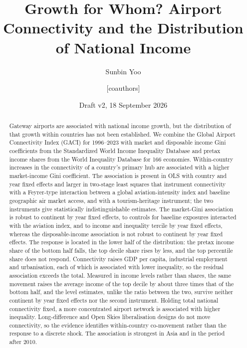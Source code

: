 \documentclass[12pt]{article}
\title{Growth for Whom? Airport Connectivity and the Distribution of National Income}
\author{Sunbin Yoo \and [coauthors]}
\date{Draft v2, 18 September 2026}
\begin{document}
\maketitle

\begin{abstract}
Gateway airports are associated with national income growth, but the distribution of that growth within countries has not been established. We combine the Global Airport Connectivity Index (GACI) for 1996--2023 with market and disposable income Gini coefficients from the Standardized World Income Inequality Database and pretax income shares from the World Inequality Database for 166 economies. Within-country increases in the connectivity of a country's primary hub are associated with a higher market-income Gini coefficient. The association is present in OLS with country and year fixed effects and larger in two-stage least squares that instrument connectivity with a Feyrer-type interaction between a global aviation-intensity index and baseline geographic air market access, and with a tourism-heritage instrument; the two instruments give statistically indistinguishable estimates. The market-Gini association is robust to continent by year fixed effects, to controls for baseline exposures interacted with the aviation index, and to income and inequality tercile by year fixed effects, whereas the disposable-income association is not robust to continent by year fixed effects. The response is located in the lower half of the distribution: the pretax income share of the bottom half falls, the top decile share rises by less, and the top percentile share does not respond. Connectivity raises GDP per capita, industrial employment and urbanisation, each of which is associated with lower inequality, so the residual association exceeds the total. Measured in income levels rather than shares, the same movement raises the average income of the top decile by about three times that of the bottom half, and the level estimates, unlike the ratio between the two, survive neither continent by year fixed effects nor the second instrument. Holding total national connectivity fixed, a more concentrated airport network is associated with higher inequality. Long-difference and Open Skies liberalisation designs do not move connectivity, so the evidence identifies within-country co-movement rather than the response to a discrete shock. The association is strongest in Asia and in the period after 2010.
\end{abstract}
\end{document}
